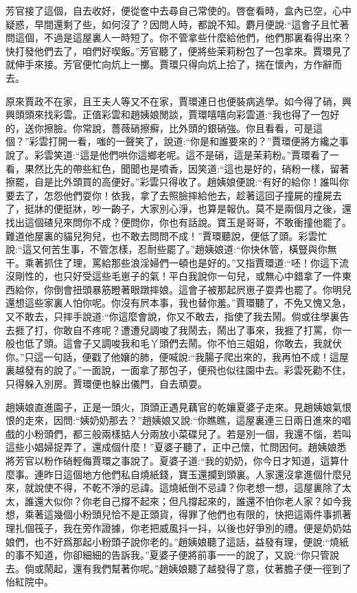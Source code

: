 \begin{parag}
    芳官接了這個，自去收好，便從奩中去尋自己常使的。啓奩看時，盒內已空，心中疑惑，早間還剩了些，如何沒了？因問人時，都說不知。麝月便說:“這會子且忙著問這個，不過是這屋裏人一時短了。你不管拿些什麼給他們，他們那裏看得出來？快打發他們去了，咱們好喫飯。”芳官聽了，便將些茉莉粉包了一包拿來。賈環見了就伸手來接。芳官便忙向炕上一擲。賈環只得向炕上拾了，揣在懷內，方作辭而去。
\end{parag}


\begin{parag}
    原來賈政不在家，且王夫人等又不在家，賈環連日也便裝病逃學。如今得了硝，興興頭頭來找彩雲。正值彩雲和趙姨娘閒談，賈環嘻嘻向彩雲道:“我也得了一包好的，送你擦臉。你常說，薔薇硝擦癬，比外頭的銀硝強。你且看看，可是這個？”彩雲打開一看，嗤的一聲笑了，說道:“你是和誰要來的？”賈環便將方纔之事說了。彩雲笑道:“這是他們哄你這鄉老呢。這不是硝，這是茉莉粉。”賈環看了一看，果然比先的帶些紅色，聞聞也是噴香，因笑道:“這也是好的，硝粉一樣，留著擦罷，自是比外頭買的高便好。”彩雲只得收了。趙姨娘便說:“有好的給你！誰叫你要去了，怎怨他們耍你！依我，拿了去照臉摔給他去，趁著這回子撞屍的撞屍去了，挺牀的便挺牀，吵一齣子，大家別心淨，也算是報仇。莫不是兩個月之後，還找出這個碴兒來問你不成？便問你，你也有話說。寶玉是哥哥，不敢衝撞他罷了。難道他屋裏的貓兒狗兒，也不敢去問問不成！”賈環聽說，便低了頭。彩雲忙說:“這又何苦生事，不管怎樣，忍耐些罷了。”趙姨娘道:“你快休管，橫豎與你無干。乘著抓住了理，罵給那些浪淫婦們一頓也是好的。”又指賈環道:“呸！你這下流沒剛性的，也只好受這些毛崽子的氣！平白我說你一句兒，或無心中錯拿了一件東西給你，你倒會扭頭暴筋瞪著眼蹾摔娘。這會子被那起屄崽子耍弄也罷了。你明兒還想這些家裏人怕你呢。你沒有屄本事，我也替你羞。”賈環聽了，不免又愧又急，又不敢去，只摔手說道:“你這麼會說，你又不敢去，指使了我去鬧。倘或往學裏告去捱了打，你敢自不疼呢？遭遭兒調唆了我鬧去，鬧出了事來，我捱了打罵，你一般也低了頭。這會子又調唆我和毛丫頭們去鬧。你不怕三姐姐，你敢去，我就伏你。”只這一句話，便戳了他孃的肺，便喊說:“我腸子爬出來的，我再怕不成！這屋裏越發有的說了。”一面說，一面拿了那包子，便飛也似往園中去。彩雲死勸不住，只得躲入別房。賈環便也躲出儀門，自去頑耍。
\end{parag}


\begin{parag}
    趙姨娘直進園子，正是一頭火，頂頭正遇見藕官的乾孃夏婆子走來。見趙姨娘氣恨恨的走來，因問:“姨奶奶那去？”趙姨娘又說:“你瞧瞧，這屋裏連三日兩日進來的唱戲的小粉頭們，都三般兩樣掂人分兩放小菜碟兒了。若是別一個，我還不惱，若叫這些小娼婦捉弄了，還成個什麼！”夏婆子聽了，正中己懷，忙問因何。趙姨娘悉將芳官以粉作硝輕侮賈環之事說了。夏婆子道:“我的奶奶，你今日才知道，這算什麼事。連昨日這個地方他們私自燒紙錢，寶玉還攔到頭裏。人家還沒拿進個什麼兒來，就說使不得，不乾不淨的忌諱。這燒紙倒不忌諱？你老想一想，這屋裏除了太太，誰還大似你？你老自己撐不起來；但凡撐起來的，誰還不怕你老人家？如今我想，乘著這幾個小粉頭兒恰不是正頭貨，得罪了他們也有限的，快把這兩件事抓著理扎個筏子，我在旁作證據，你老把威風抖一抖，以後也好爭別的禮。便是奶奶姑娘們，也不好爲那起小粉頭子說你老的。”趙姨娘聽了這話，益發有理，便說:“燒紙的事不知道，你卻細細的告訴我。”夏婆子便將前事一一的說了，又說:“你只管說去。倘或鬧起，還有我們幫著你呢。”趙姨娘聽了越發得了意，仗著膽子便一徑到了怡紅院中。
\end{parag}


